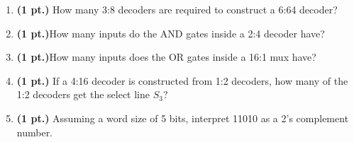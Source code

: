 \documentclass{article}
\begin{document}
\begin{enumerate}
\item {\bf (1 pt.)} How many 3:8 decoders are required to construct a 6:64 decoder?

\item {\bf (1 pt.)}How many inputs do the AND gates inside a 2:4 decoder have?

\item {\bf (1 pt.)}How many inputs does the OR gates inside a 16:1 mux have?

\pagebreak{}
\item {\bf (1 pt.)} If a 4:16 decoder is constructed from 1:2 decoders, how
many of the 1:2 decoders get the select line $S_3$?

\item {\bf (1 pt.)} Assuming a word size of 5 bits, interpret 11010 as a 2's complement
number.



\end{enumerate}
\end{document}
